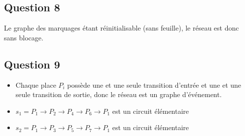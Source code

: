\subsection{Question 8}

Le graphe des marquages étant réinitialisable (sans feuille), le réseau est donc sans blocage.

\subsection{Question 9}

\begin{itemize}
  \item Chaque place $P_i$ possède une et une seule transition d'entrée et une et une seule transition de sortie, donc le réseau est un graphe d'événement.
  \item $s_1 = P_1 \rightarrow P_2 \rightarrow P_4 \rightarrow P_6 \rightarrow P_1$ est un circuit élémentaire
  \item $s_2 = P_1 \rightarrow P_3 \rightarrow P_5 \rightarrow P_7 \rightarrow P_1$ est un circuit élémentaire
\end{itemize}
